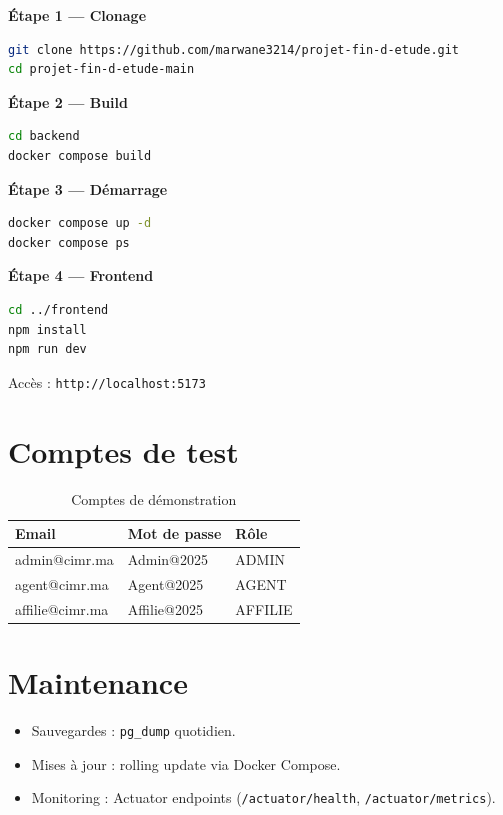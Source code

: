 \documentclass[12pt,a4paper,oneside]{report}
\begin{document}
\textbf{Étape 1 --- Clonage}
\begin{lstlisting}[language=bash]
git clone https://github.com/marwane3214/projet-fin-d-etude.git
cd projet-fin-d-etude-main
\end{lstlisting}

\textbf{Étape 2 --- Build}
\begin{lstlisting}[language=bash]
cd backend
docker compose build
\end{lstlisting}

\textbf{Étape 3 --- Démarrage}
\begin{lstlisting}[language=bash]
docker compose up -d
docker compose ps
\end{lstlisting}

\textbf{Étape 4 --- Frontend}
\begin{lstlisting}[language=bash]
cd ../frontend
npm install
npm run dev
\end{lstlisting}

Accès : \texttt{http://localhost:5173}

\section{Comptes de test}
\begin{table}[H]
\centering
\caption{Comptes de démonstration}
\begin{tabular}{lll}
\toprule
\textbf{Email} & \textbf{Mot de passe} & \textbf{Rôle} \\
\midrule
admin@cimr.ma & Admin@2025 & ADMIN \\
agent@cimr.ma & Agent@2025 & AGENT \\
affilie@cimr.ma & Affilie@2025 & AFFILIE \\
\bottomrule
\end{tabular}
\end{table}

\section{Maintenance}
\begin{itemize}
    \item Sauvegardes : \texttt{pg\_dump} quotidien.
    \item Mises à jour : rolling update via Docker Compose.
    \item Monitoring : Actuator endpoints (\texttt{/actuator/health}, \texttt{/actuator/metrics}).
\end{itemize}
\end{document}

